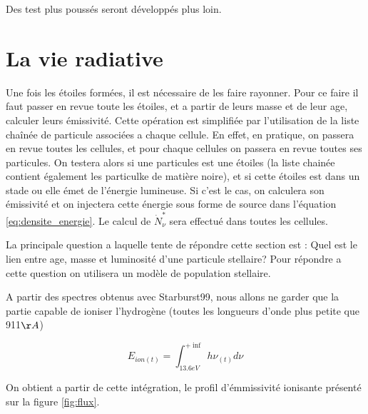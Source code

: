 Des test plus poussés seront développés plus loin.



\section{La vie radiative}

Une fois les étoiles formées, il est nécessaire de les faire rayonner.
Pour ce faire il faut passer en revue toute les étoiles, et a partir de leurs masse et de leur age, calculer leurs émissivité.
Cette opération est simplifiée par l'utilisation de la liste chaînée de particule associées a chaque cellule. %
En effet, en pratique, on passera en revue toutes les cellules, et pour chaque cellules on passera en revue toutes ses particules.
On testera alors si une particules est une étoiles (la liste chainée contient également les particulke de matière noire), et si cette étoiles est dans un stade ou elle émet de l'énergie lumineuse.
Si c'est le cas, on calculera son émissivité et on injectera cette énergie sous forme de source dans l'équation \ref{eq:densite_energie}.
Le calcul de $\dot{N}_\nu^*$ sera effectué dans toutes les cellules.

La principale question a laquelle tente de répondre cette section est : Quel est le lien entre age, masse et luminosité d'une particule stellaire?
Pour répondre a cette question on utilisera un modèle de population stellaire.

A partir des spectres obtenus avec Starburst99, nous allons ne garder que la partie capable de ioniser l'hydrogène (toutes les longueurs d'onde plus petite que 911$\AA$) 

\begin{equation}
E_{ion (t)} = \int_{13.6eV}^{+\inf} h \nu_{(t)} d\nu
\end{equation}

On obtient a partir de cette intégration, le profil d'émmissivité ionisante présenté sur la figure \ref{fig:flux}.

